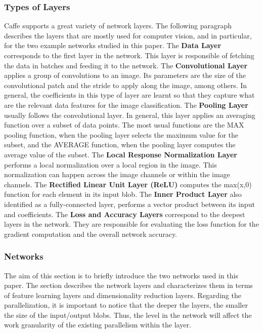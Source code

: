 \subsubsection{Types of Layers}
Caffe supports a great variety of network layers. The following 
paragraph describes the layers that are mostly used for computer vision, and 
in particular, for the two example networks studied in this paper.
The \textbf{Data Layer} corresponds to the first layer in the 
network. This layer is responsible of fetching the data in batches and 
feeding it to the network. The \textbf{Convolutional Layer} applies 
a group of convolutions to an image. Its parameters are the size of the 
convolutional patch and the stride to apply along the image, among others. 
In general, the coefficients in this type of layer are learnt so that 
they capture what are the relevant data features 
for the image classification. The \textbf{Pooling Layer} usually 
follows the convolutional layer. In general, this layer applies an averaging 
function over a subset of data points. The most usual functions are the 
MAX pooling function, when the pooling layer selects the maximum value for the 
subset, and the AVERAGE function, when the pooling layer computes the average 
value of the subset. The \textbf{Local Response Normalization Layer} 
performs a local normalization over a local region in the image. 
This normalization can happen across the image channels or within the image 
channels. The \textbf{Rectified Linear Unit Layer (ReLU)} computes 
the max(x,0) function for each element in its input blob. 
The \textbf{Inner Product Layer} also identified as a fully-connected layer, 
performs a vector product between its input and coefficients.  
The \textbf{Loss and Accuracy Layers} correspond 
to the deepest layers in the network. They are responsible for evaluating the 
loss function for the gradient computation and the overall network accuracy.

\subsubsection{Networks}
The aim of this section is to briefly introduce the two networks 
used in this paper. The section describes the network layers and characterizes 
them in terms of feature learning layers and dimensionality reduction 
layers. Regarding the parallelization, it is important to notice that 
the deeper the layers, the smaller the size of the input/output blobs. 
Thus, the level in the network will affect the work granularity of the 
existing parallelism within the layer. 

